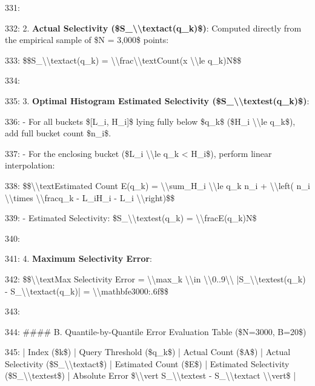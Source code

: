 \documentclass[11pt,a4paper]{article}
\begin{document}
331:

332: 2. \textbf{Actual Selectivity (\$S\_{{\textbackslash{}\textbackslash{}text{{act}}}}(q\_k)\$)}: Computed directly from the empirical sample of \$N = 3,000\$ points:

333:    \$\$S\_{{\textbackslash{}\textbackslash{}text{{act}}}}(q\_k) = \textbackslash{}\textbackslash{}frac{{\textbackslash{}\textbackslash{}text{{Count}}(x \textbackslash{}\textbackslash{}le q\_k)}}{{N}}\$\$

334:

335: 3. \textbf{Optimal Histogram Estimated Selectivity (\$S\_{{\textbackslash{}\textbackslash{}text{{est}}}}(q\_k)\$)}:

336:    - For all buckets \$[L\_i, H\_i]\$ lying fully below \$q\_k\$ (\$H\_i \textbackslash{}\textbackslash{}le q\_k\$), add full bucket count \$n\_i\$.

337:    - For the enclosing bucket (\$L\_i \textbackslash{}\textbackslash{}le q\_k < H\_i\$), perform linear interpolation:

338:      \$\$\textbackslash{}\textbackslash{}text{{Estimated Count }} E(q\_k) = \textbackslash{}\textbackslash{}sum\_{{H\_i \textbackslash{}\textbackslash{}le q\_k}} n\_i + \textbackslash{}\textbackslash{}left( n\_i \textbackslash{}\textbackslash{}times \textbackslash{}\textbackslash{}frac{{q\_k - L\_i}}{{H\_i - L\_i}} \textbackslash{}\textbackslash{}right)\$\$

339:    - Estimated Selectivity: \$S\_{{\textbackslash{}\textbackslash{}text{{est}}}}(q\_k) = \textbackslash{}\textbackslash{}frac{{E(q\_k)}}{{N}}\$

340:

341: 4. \textbf{Maximum Selectivity Error}:

342:    \$\$\textbackslash{}\textbackslash{}text{{Max Selectivity Error}} = \textbackslash{}\textbackslash{}max\_{{k \textbackslash{}\textbackslash{}in \textbackslash{}\textbackslash{}{{0..9\textbackslash{}\textbackslash{}}}}} |S\_{{\textbackslash{}\textbackslash{}text{{est}}}}(q\_k) - S\_{{\textbackslash{}\textbackslash{}text{{act}}}}(q\_k)| = \textbackslash{}\textbackslash{}mathbf{{{e3000:.6f}}}\$\$

343:

344: \#\#\#\# B. Quantile-by-Quantile Error Evaluation Table (\$N=3000, B=20\$)

345: | Index (\$k\$) | Query Threshold (\$q\_k\$) | Actual Count (\$A\$) | Actual Selectivity (\$S\_{{\textbackslash{}\textbackslash{}text{{act}}}}\$) | Estimated Count (\$E\$) | Estimated Selectivity (\$S\_{{\textbackslash{}\textbackslash{}text{{est}}}}\$) | Absolute Error \$\textbackslash{}\textbackslash{}vert S\_{{\textbackslash{}\textbackslash{}text{{est}}}} - S\_{{\textbackslash{}\textbackslash{}text{{act}}}} \textbackslash{}\textbackslash{}vert\$ |
\end{document}
